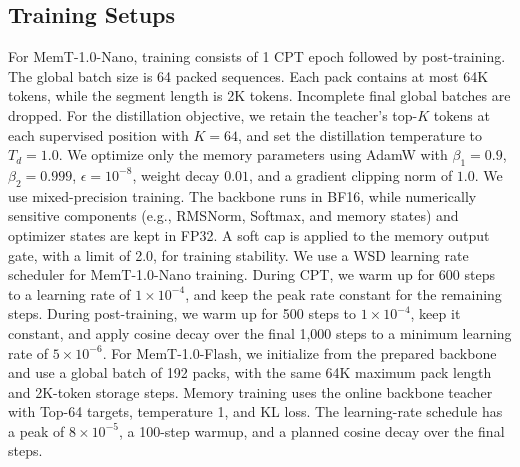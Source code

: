 \subsection{Training Setups}
For MemT-1.0-Nano, training consists of 1 CPT epoch followed by post-training.
The global batch size is 64 packed sequences.
Each pack contains at most 64K tokens, while the segment length is 2K tokens.
Incomplete final global batches are dropped.
For the distillation objective, we retain the teacher's top-$K$ tokens at each supervised position with $K=64$, and set the distillation temperature to $T_{d}=1.0$.
We optimize only the memory parameters using AdamW with $\beta_1=0.9$, $\beta_2=0.999$, $\epsilon=10^{-8}$, weight decay $0.01$, and a gradient clipping norm of $1.0$.
We use mixed-precision training.
The backbone runs in BF16, while numerically sensitive components (e.g., RMSNorm, Softmax, and memory states) and optimizer states are kept in FP32.
A soft cap is applied to the memory output gate, with a limit of 2.0, for training stability.
We use a WSD learning rate scheduler for MemT-1.0-Nano training. During CPT, we warm up for 600 steps to a learning rate of $1\times10^{-4}$, and keep the peak rate constant for the remaining steps. During post-training, we warm up for 500 steps to $1\times10^{-4}$, keep it constant, and apply cosine decay over the final 1,000 steps to a minimum learning rate of $5\times10^{-6}$.
For MemT-1.0-Flash, we initialize from the prepared backbone and use a global batch of 192 packs, with the same 64K maximum pack length and 2K-token storage steps.
Memory training uses the online backbone teacher with Top-64 targets, temperature 1, and KL loss.
The learning-rate schedule has a peak of $8\times10^{-5}$, a 100-step warmup, and a planned cosine decay over the final steps.